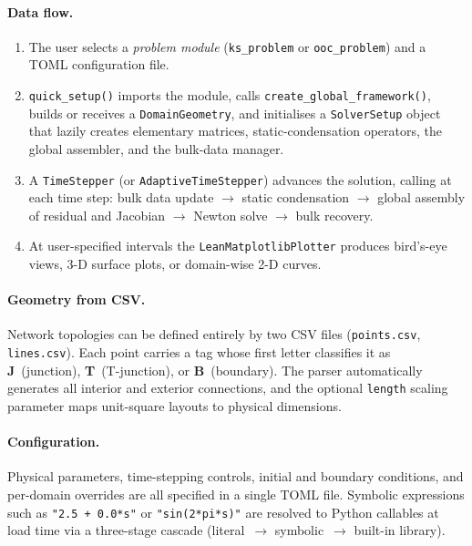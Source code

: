 \documentclass[11pt,a4paper]{article}
\newcommand{\code}[1]{\texttt{#1}}
\begin{document}
\paragraph{Data flow.}
\begin{enumerate}
  \item The user selects a \emph{problem module}
        (\code{ks\_problem} or \code{ooc\_problem}) and a
        TOML configuration file.
  \item \code{quick\_setup()} imports the module, calls
        \code{create\_global\_framework()}, builds or receives a
        \code{DomainGeometry}, and initialises a
        \code{SolverSetup} object that lazily creates elementary
        matrices, static-condensation operators, the global assembler,
        and the bulk-data manager.
  \item A \code{TimeStepper} (or \code{AdaptiveTimeStepper}) advances
        the solution, calling at each time step:
        bulk data update $\to$ static condensation $\to$ global
        assembly of residual and Jacobian $\to$ Newton solve $\to$
        bulk recovery.
  \item At user-specified intervals the \code{LeanMatplotlibPlotter}
        produces bird's-eye views, 3-D surface plots, or domain-wise
        2-D curves.
\end{enumerate}

\paragraph{Geometry from CSV.}
Network topologies can be defined entirely by two CSV files
(\code{points.csv}, \code{lines.csv}).  Each point carries a
tag whose first letter classifies it as \textbf{J}~(junction),
\textbf{T}~(T-junction), or \textbf{B}~(boundary).  The parser
automatically generates all interior and exterior connections,
and the optional \code{length} scaling parameter maps unit-square
layouts to physical dimensions.

\paragraph{Configuration.}
Physical parameters, time-stepping controls, initial and boundary
conditions, and per-domain overrides are all specified in a single
TOML file.  Symbolic expressions such as
\code{"2.5 + 0.0*s"} or \code{"sin(2*pi*s)"} are resolved to
Python callables at load time via a three-stage cascade
(literal~$\to$ symbolic~$\to$ built-in library).
\end{document}
